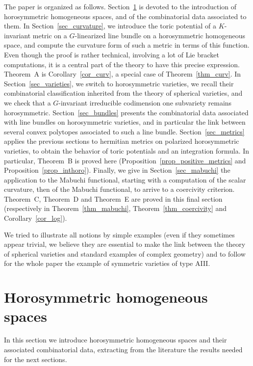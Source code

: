 \documentclass{amsart}
\theoremstyle{definition}
\begin{document}
The paper is organized as follows.
Section~\ref{sec_homogeneous} 
is devoted to the introduction of horosymmetric homogeneous spaces, and  of the 
combinatorial data associated to them. 
In Section~\ref{sec_curvature}, 
we introduce the toric potential of a $K$-invariant metric on 
a $G$-linearized line bundle on a horosymmetric homogeneous space, and compute 
the curvature form of such a metric in terms of this function. Even though 
the proof is rather technical, involving a lot of Lie bracket computations, 
it is a central part of the theory to have this precise expression. Theorem~A 
 is Corollary~\ref{cor_curv}, a special case of Theorem~\ref{thm_curv}.
In Section~\ref{sec_varieties}, 
we switch to horosymmetric varieties, we recall their combinatorial classification 
inherited from the theory of spherical varieties, and we check that a $G$-invariant 
irreducible codimension one subvariety remains horosymmetric. 
Section~\ref{sec_bundles} 
presents the combinatorial data associated with line bundles on horosymmetric 
varieties, and in particular the link between several convex polytopes associated 
to such a line bundle. 
Section~\ref{sec_metrics} 
applies the previous sections to hermitian metrics on polarized horosymmetric 
varieties, to obtain the behavior of toric potentials and an integration 
formula. In particular, Theorem~B is proved here 
(Proposition~\ref{prop_positive_metrics} and Proposition~\ref{prop_inthoro}). 
Finally, we give in Section~\ref{sec_mabuchi} 
the application to the Mabuchi functional, starting with a computation of 
the scalar curvature, then of the Mabuchi functional, to arrive to a coercivity 
criterion. Theorem~C, Theorem~D and Theorem~E are proved in this final section
(respectively in Theorem~\ref{thm_mabuchi}, Theorem~\ref{thm_coercivity} 
and Corollary~\ref{cor_log}). 

We tried to illustrate all notions by simple examples 
(even if they sometimes appear trivial, we believe they are essential to make the 
link between the theory of spherical varieties and standard examples of 
complex geometry) 
and to follow for the whole paper the example of symmetric varieties 
of type AIII. 


\section{Horosymmetric homogeneous spaces}

\label{sec_homogeneous}

In this section we introduce horosymmetric homogeneous spaces and their 
associated combinatorial data, extracting from the literature the results 
needed for the next sections. 
\end{document}
